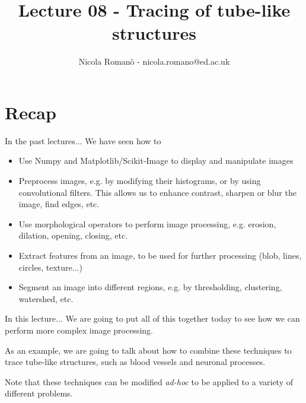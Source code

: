 \documentclass[9pt, aspectratio=169]{beamer}
\author{Nicola Roman\`o - nicola.romano@ed.ac.uk}
\title{Lecture 08 - Tracing of tube-like structures}
\date{}
\begin{document}

\begin{frame}
    \titlepage
\end{frame}

\section{Recap}

\begin{frame}
    {In the past lectures...}
    We have seen how to

    \begin{itemize}[<+->]
        \item [\checkmark] Use Numpy and Matplotlib/Scikit-Image to display and manipulate images
        \item [\checkmark] Preprocess images, e.g. by modifying their histograms, or by using convolutional filters. This allows us to enhance contrast, sharpen or blur the image, find edges, etc.
        \item [\checkmark] Use morphological operators to perform image processing, e.g. erosion, dilation, opening, closing, etc.
        \item [\checkmark] Extract features from an image, to be used for further processing (blob, lines, circles, texture...)
        \item [\checkmark] Segment an image into different regions, e.g. by thresholding, clustering, watershed, etc.
    \end{itemize}
\end{frame}

\begin{frame}
    {In this lecture...}
    We are going to put all of this together today to see how we can perform more complex image processing.

    As an example, we are going to talk about how to combine these techniques to trace tube-like structures, such as blood vessels and neuronal processes.

    Note that these techniques can be modified \textit{ad-hoc} to be applied to a variety of different problems.
\end{frame}
\end{document}
